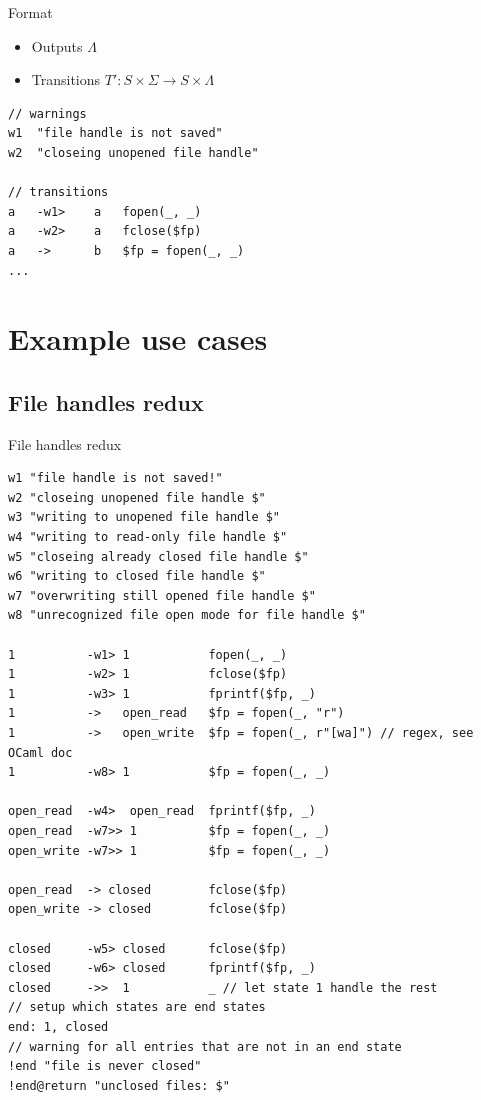 \documentclass{beamer}
\newcommand{\inlineC}[1]{\lstinline[language=C]$#1$}
\begin{document}
\begin{frame}[fragile]{Format}
\begin{itemize}
\item Outputs $\Lambda$
\item Transitions $T' : S \times \Sigma \to S \times \Lambda$
\end{itemize}
\begin{lstlisting}
// warnings
w1  "file handle is not saved"
w2  "closeing unopened file handle"

// transitions
a   -w1>    a   fopen(_, _)
a   -w2>    a   fclose($fp)
a   ->      b   $fp = fopen(_, _)
...
\end{lstlisting}
\end{frame}


\section{Example use cases}

\subsection{File handles redux}

\begin{frame}[fragile]{File handles redux}
\begin{lstlisting}[basicstyle=\tiny\ttfamily,]
w1 "file handle is not saved!"
w2 "closeing unopened file handle $"
w3 "writing to unopened file handle $"
w4 "writing to read-only file handle $"
w5 "closeing already closed file handle $"
w6 "writing to closed file handle $"
w7 "overwriting still opened file handle $"
w8 "unrecognized file open mode for file handle $"

1          -w1> 1           fopen(_, _)
1          -w2> 1           fclose($fp)
1          -w3> 1           fprintf($fp, _)
1          ->   open_read   $fp = fopen(_, "r")
1          ->   open_write  $fp = fopen(_, r"[wa]") // regex, see OCaml doc
1          -w8> 1           $fp = fopen(_, _)

open_read  -w4>  open_read  fprintf($fp, _)
open_read  -w7>> 1          $fp = fopen(_, _)
open_write -w7>> 1          $fp = fopen(_, _)

open_read  -> closed        fclose($fp)
open_write -> closed        fclose($fp)

closed     -w5> closed      fclose($fp)
closed     -w6> closed      fprintf($fp, _)
closed     ->>  1           _ // let state 1 handle the rest
// setup which states are end states
end: 1, closed
// warning for all entries that are not in an end state
!end "file is never closed"
!end@return "unclosed files: $"
\end{lstlisting}
\end{frame}
\end{document}

